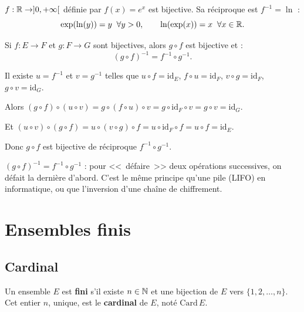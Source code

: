 \begin{exbox}
$f : \mathbb{R} \to ]0, +\infty[$ définie par $f(x) = e^x$ est bijective. Sa réciproque est $f^{-1} = \ln$ :
\[\exp(\ln(y)) = y \;\;\forall y > 0, \qquad \ln(\exp(x)) = x \;\;\forall x \in \mathbb{R}.\]
\end{exbox}

\begin{propbox}
Si $f : E \to F$ et $g : F \to G$ sont bijectives, alors $g \circ f$ est bijective et :
\[(g \circ f)^{-1} = f^{-1} \circ g^{-1}.\]
\end{propbox}

\begin{proofbox}
Il existe $u = f^{-1}$ et $v = g^{-1}$ telles que $u \circ f = \mathrm{id}_E$, $f \circ u = \mathrm{id}_F$, $v \circ g = \mathrm{id}_F$, $g \circ v = \mathrm{id}_G$.

Alors $(g \circ f) \circ (u \circ v) = g \circ (f \circ u) \circ v = g \circ \mathrm{id}_F \circ v = g \circ v = \mathrm{id}_G$.

Et $(u \circ v) \circ (g \circ f) = u \circ (v \circ g) \circ f = u \circ \mathrm{id}_F \circ f = u \circ f = \mathrm{id}_E$.

Donc $g \circ f$ est bijective de réciproque $f^{-1} \circ g^{-1}$.
\end{proofbox}

\begin{intuitionbox}
$(g \circ f)^{-1} = f^{-1} \circ g^{-1}$ : pour <<~défaire~>> deux opérations successives, on défait la dernière d'abord. C'est le même principe qu'une pile (LIFO) en informatique, ou que l'inversion d'une chaîne de chiffrement.
\end{intuitionbox}


\section{Ensembles finis}

\subsection{Cardinal}

\begin{defbox}[--- Cardinal]
Un ensemble $E$ est \textbf{fini} s'il existe $n \in \mathbb{N}$ et une bijection de $E$ vers $\{1, 2, \ldots, n\}$. Cet entier $n$, unique, est le \textbf{cardinal} de $E$, noté $\mathrm{Card}\, E$.
\end{defbox}

